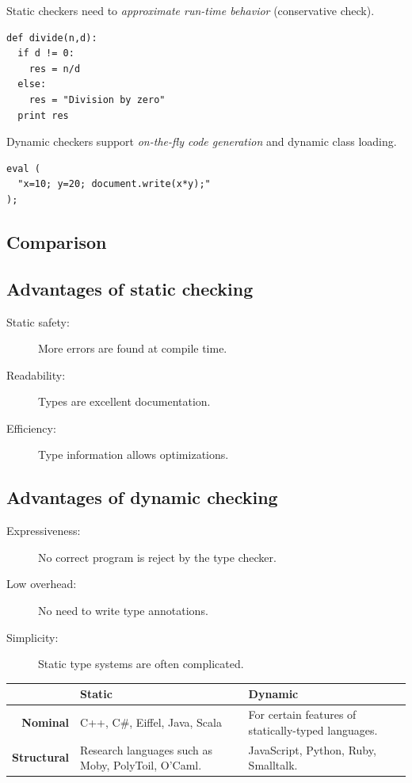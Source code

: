 Static checkers need to \emph{approximate run-time behavior} (conservative check). 
\lstset{language=Python}
\begin{lstlisting}[caption=Python example on dynamic type checking]
def divide(n,d):
  if d != 0:
    res = n/d
  else:
    res = "Division by zero"
  print res
\end{lstlisting}

Dynamic checkers support \emph{on-the-fly code generation} and dynamic class loading.
\lstset{language=Java}
\begin{lstlisting}[caption=JavaScript example on on-the-fly code generation]
eval (
  "x=10; y=20; document.write(x*y);"
);
\end{lstlisting}

\subsection{Comparison}

\subsection{Advantages of static checking}
\begin{description}
 \item[Static safety:] More errors are found at compile time.
 \item[Readability:] Types are excellent documentation.
 \item[Efficiency:] Type information allows optimizations.
\end{description}
\subsection{Advantages of dynamic checking}
\begin{description}
 \item[Expressiveness:] No correct program is reject by the type checker.
 \item[Low overhead:] No need to write type annotations.
 \item[Simplicity:] Static type systems are often complicated.
\end{description}

\begin{tabular}{r|p{5cm}p{5cm}}
& \textbf{Static} & \textbf{Dynamic}\\ \hline
\textbf{Nominal} & C++, C\#, Eiffel, Java, Scala & For certain features of statically-typed languages.\\
\textbf{Structural}& Research languages such as Moby, PolyToil, O'Caml. & JavaScript, Python, Ruby, Smalltalk.
\end{tabular}\\

